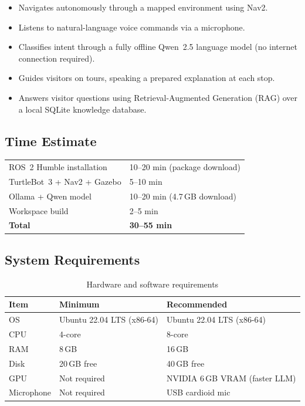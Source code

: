 \documentclass[12pt,a4paper]{report}
\begin{document}
\begin{itemize}[leftmargin=2em]
  \item Navigates autonomously through a mapped environment using Nav2.
  \item Listens to natural-language voice commands via a microphone.
  \item Classifies intent through a fully offline Qwen~2.5 language model
        (no internet connection required).
  \item Guides visitors on tours, speaking a prepared explanation at each stop.
  \item Answers visitor questions using Retrieval-Augmented Generation (RAG)
        over a local SQLite knowledge database.
\end{itemize}

\subsection*{Time Estimate}

\begin{tcolorbox}[notebox, title=Approximate First-Run Times]
  \begin{tabular}{ll}
    ROS~2 Humble installation  & 10--20 min (package download) \\
    TurtleBot~3 + Nav2 + Gazebo & 5--10 min \\
    Ollama + Qwen model          & 10--20 min (4.7\,GB download) \\
    Workspace build              & 2--5 min \\
    \textbf{Total}               & \textbf{30--55 min} \\
  \end{tabular}
\end{tcolorbox}

\subsection*{System Requirements}

\begin{table}[H]
  \centering
  \caption{Hardware and software requirements}
  \begin{tabularx}{\linewidth}{L{3.5cm} L{4.5cm} X}
    \toprule
    \textbf{Item} & \textbf{Minimum} & \textbf{Recommended} \\
    \midrule
    OS      & Ubuntu 22.04 LTS (x86-64) & Ubuntu 22.04 LTS (x86-64) \\
    CPU     & 4-core                    & 8-core \\
    RAM     & 8\,GB                     & 16\,GB \\
    Disk    & 20\,GB free               & 40\,GB free \\
    GPU     & Not required              & NVIDIA 6\,GB VRAM (faster LLM) \\
    Microphone & Not required           & USB cardioid mic \\
    \bottomrule
  \end{tabularx}
\end{table}
\end{document}
